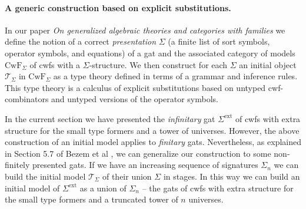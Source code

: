 \documentclass[11pt,a4paper]{article}
\theoremstyle{plain}
\theoremstyle{definition}
\newcommand{\T}{\mathsf{T}}
\def\T{\mathcal{T}}
\def\CwF{\mathrm{CwF}}
\def\Sigmaext{{\Sigma^\mathrm{ext}}}
\begin{document}
\paragraph{A generic construction based on explicit substitutions.} In our paper {\em On generalized algebraic theories and categories with families} \cite{bezem:hofmann} we define the notion of a correct {\em presentation} $\Sigma$ (a finite list of sort symbols, operator symbols, and equations) of a gat and the associated category of models $\CwF_\Sigma$ of cwfs with a $\Sigma$-structure. We then construct for each $\Sigma$ an initial object $\T_\Sigma$ in $\CwF_\Sigma$ as a type theory defined in terms of a grammar and inference rules. This type theory is a calculus of explicit substitutions based on untyped cwf-combinators and untyped versions of the operator symbols.

In the current section we have presented the {\em infinitary} gat $\Sigmaext$ of cwfs with extra structure for the small type formers and a tower of universes. However, the above construction of an initial model applies to {\em finitary} gats. Nevertheless, as explained in Section 5.7 of Bezem et al  \cite{bezem:hofmann}, we can generalize our construction to some non-finitely presented gats. If we have an increasing sequence of signatures $\Sigma_n$ we can build the initial model $\T_\Sigma$ of their union $\Sigma$ in stages. In this way we can build an initial model of $\Sigmaext$ as a union of $\Sigma_n$ -- the gats of cwfs with extra structure for the small type formers and a truncated tower of $n$ universes.
\end{document}
